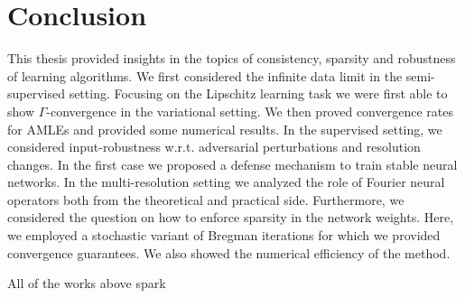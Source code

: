 \chapter{Conclusion}\label{ch:SL}
%
%
This thesis provided insights in the topics of consistency, sparsity and robustness of learning algorithms. We first considered the infinite data limit in the semi-supervised setting. Focusing on the Lipschitz learning task we were first able to show $\Gamma$-convergence in the variational setting. We then proved convergence rates for AMLEs and provided some numerical results. In the supervised setting, we considered input-robustness w.r.t. adversarial perturbations and resolution changes. In the first case we proposed a defense mechanism to train stable neural networks. In the multi-resolution setting we analyzed the role of Fourier neural operators both from the theoretical and practical side. Furthermore, we considered the question on how to enforce sparsity in the network weights. Here, we employed a stochastic variant of Bregman iterations for which we provided convergence guarantees. We also showed the numerical efficiency of the method.

All of the works above spark